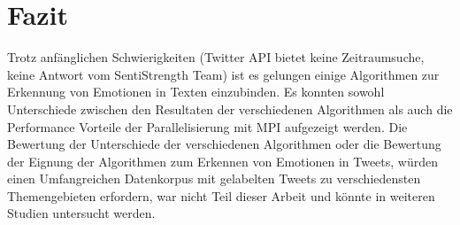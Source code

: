 \clearpage
\section{Fazit}
Trotz anfänglichen Schwierigkeiten (Twitter API bietet keine Zeitraumsuche, keine Antwort vom SentiStrength Team) ist es gelungen einige Algorithmen zur Erkennung von Emotionen in Texten einzubinden. Es konnten sowohl Unterschiede zwischen den Resultaten der verschiedenen Algorithmen als auch die Performance Vorteile der Parallelisierung mit MPI aufgezeigt werden. Die Bewertung der Unterschiede der verschiedenen Algorithmen oder die Bewertung der Eignung der Algorithmen zum Erkennen von Emotionen in Tweets, würden einen Umfangreichen Datenkorpus mit gelabelten Tweets zu verschiedensten Themengebieten erfordern, war nicht Teil dieser Arbeit und könnte in weiteren Studien untersucht werden.